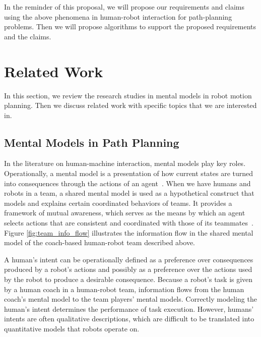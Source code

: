 \documentclass[phd]{byuprop}
\begin{document}
In the reminder of this proposal, we will propose our requirements and claims using the above phenomena in human-robot interaction for path-planning problems.
Then we will propose algorithms to support the proposed requirements and the claims.

\section{Related Work}
\label{sec:related_work}

In this section, we review the research studies in mental models in robot motion planning.
Then we discuss related work with specific topics that we are interested in.

\subsection{Mental Models in Path Planning}
\label{sec:related_work:mental_models_in_path_planning}

In the literature on human-machine interaction, mental models play key roles.
Operationally, a mental model is a presentation of how current states are turned into consequences through the actions of an agent~\cite{gray2014manipulating}.
When we have humans and robots in a team, a shared mental model is used as a hypothetical construct that models and explains certain coordinated behaviors of teams.
It provides a framework of mutual awareness, which serves as the means by which an agent selects actions that are consistent and coordinated with those of its teammates~\cite{nikolaidis2012human,Yen_implementingshared,FSS149109,Jonker:2010:SMM:2018118.2018128,Neerincx2011,Mathieu2000,Kennedy2007}.
Figure \ref{fig:team_info_flow} illustrates the information flow in the shared mental model of the coach-based human-robot team described above.

A human's intent can be operationally defined as a preference over consequences produced by a robot's actions and possibly as a preference over the actions used by the robot to produce a desirable consequence.
Because a robot's task is given by a human coach in a human-robot team, information flows from the human coach's mental model to the team players' mental models.
Correctly modeling the human's intent determines the performance of task execution.
However, humans' intents are often qualitative descriptions, which are difficult to be translated into quantitative models that robots operate on.
\end{document}
